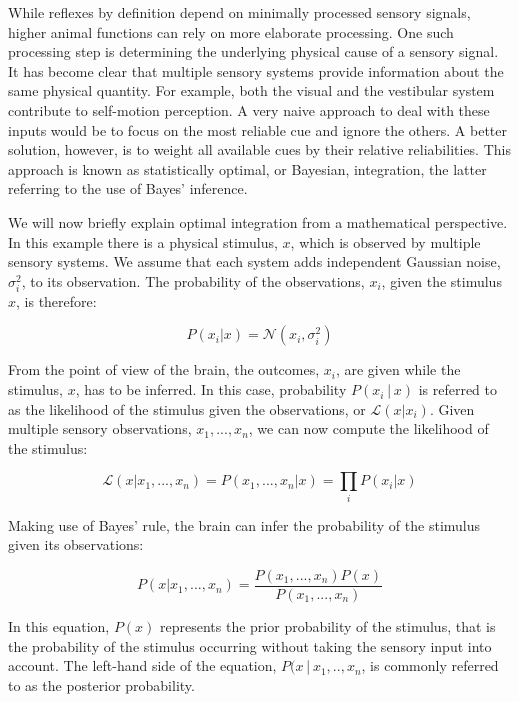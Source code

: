 While reflexes by definition depend on minimally processed sensory signals, higher animal functions can rely on more elaborate processing. One such processing step is determining the underlying physical cause of a sensory signal. It has become clear that multiple sensory systems provide information about the same physical quantity. For example, both the visual and the vestibular system contribute to self-motion perception. A very naive approach to deal with these inputs would be to focus on the most reliable cue and ignore the others. A better solution, however, is to weight all available cues by their  relative reliabilities. This approach is known as statistically optimal, or Bayesian, integration, the latter referring to the use  of Bayes' inference. 

We will now briefly explain optimal integration from a mathematical perspective.  In this example there is a physical stimulus, $x$, which is observed by multiple sensory systems. We assume that each system adds independent Gaussian noise, $\sigma_i^2$, to its observation. The probability of the observations, $x_i$, given the stimulus $x$, is therefore:

\begin{equation}
P(x_i|x)= \mathcal{N}(x_i, \sigma_i^2)
\end{equation}

From the point of view of the brain, the outcomes, $x_i$, are given while the stimulus, $x$, has to be inferred. In this case, probability $P(x_i│x)$ is referred to as the likelihood of  the  stimulus given the observations, or $\mathcal{L}(x|x_i)$. Given multiple sensory observations, $x_1,...,x_n$, we can now compute the likelihood of the stimulus:

\begin{equation}
\mathcal{L}(x|x_1,...,x_n) = P(x_1,...,x_n|x) = \prod_i P(x_i|x)
\end{equation}

Making use of Bayes' rule, the  brain can infer the probability of the stimulus given its observations:

\begin{equation}
P(x|x_1,...,x_n) = \frac{P(x_1,...,x_n)P(x)}{P(x_1,...,x_n)}
\end{equation}

In this equation, $P(x)$ represents the prior probability of the stimulus, that is the probability of the stimulus occurring without taking the sensory input into account. The left-hand side of the equation, $P(x│x_1,..,x_n$, is commonly referred to as the posterior probability.

